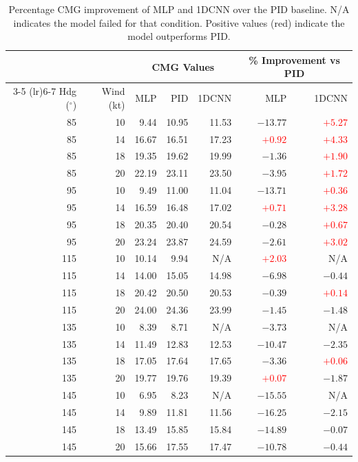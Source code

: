 \begin{table}[htbp]
\centering
\footnotesize
\setlength{\tabcolsep}{5pt}
\renewcommand{\arraystretch}{0.92}
\begin{tabular}{@{}rr rrr rr@{}}
\toprule
& & \multicolumn{3}{c}{\textbf{CMG Values}} & \multicolumn{2}{c}{\textbf{\% Improvement vs PID}} \\
\cmidrule(lr){3-5} \cmidrule(lr){6-7}
Hdg ($^\circ$) & Wind (kt) & MLP & PID & 1DCNN & MLP & 1DCNN \\
\midrule
85  & 10 &  9.44 & 10.95 & 11.53 & $-13.77$ & \textcolor{red}{$+5.27$} \\
85  & 14 & 16.67 & 16.51 & 17.23 & \textcolor{red}{$+0.92$}  & \textcolor{red}{$+4.33$} \\
85  & 18 & 19.35 & 19.62 & 19.99 & $-1.36$  & \textcolor{red}{$+1.90$} \\
85  & 20 & 22.19 & 23.11 & 23.50 & $-3.95$  & \textcolor{red}{$+1.72$} \\
\midrule
95  & 10 &  9.49 & 11.00 & 11.04 & $-13.71$ & \textcolor{red}{$+0.36$} \\
95  & 14 & 16.59 & 16.48 & 17.02 & \textcolor{red}{$+0.71$}  & \textcolor{red}{$+3.28$} \\
95  & 18 & 20.35 & 20.40 & 20.54 & $-0.28$  & \textcolor{red}{$+0.67$} \\
95  & 20 & 23.24 & 23.87 & 24.59 & $-2.61$  & \textcolor{red}{$+3.02$} \\
\midrule
115 & 10 & 10.14 &  9.94 & N/A  & \textcolor{red}{$+2.03$} & N/A     \\
115 & 14 & 14.00 & 15.05 & 14.98 & $-6.98$  & $-0.44$  \\
115 & 18 & 20.42 & 20.50 & 20.53 & $-0.39$  & \textcolor{red}{$+0.14$} \\
115 & 20 & 24.00 & 24.36 & 23.99 & $-1.45$  & $-1.48$  \\
\midrule
135 & 10 &  8.39 &  8.71 & N/A  & $-3.73$  & N/A     \\
135 & 14 & 11.49 & 12.83 & 12.53 & $-10.47$ & $-2.35$  \\
135 & 18 & 17.05 & 17.64 & 17.65 & $-3.36$  & \textcolor{red}{$+0.06$} \\
135 & 20 & 19.77 & 19.76 & 19.39 & \textcolor{red}{$+0.07$} & $-1.87$  \\
\midrule
145 & 10 &  6.95 &  8.23 & N/A  & $-15.55$ & N/A     \\
145 & 14 &  9.89 & 11.81 & 11.56 & $-16.25$ & $-2.15$  \\
145 & 18 & 13.49 & 15.85 & 15.84 & $-14.89$ & $-0.07$  \\
145 & 20 & 15.66 & 17.55 & 17.47 & $-10.78$ & $-0.44$  \\
\bottomrule
\end{tabular}
\caption{Percentage CMG improvement of MLP and 1DCNN over the PID baseline. N/A indicates the model failed for that condition. Positive values (red) indicate the model outperforms PID.}
\label{tab:cmg_improvement}
\end{table}
